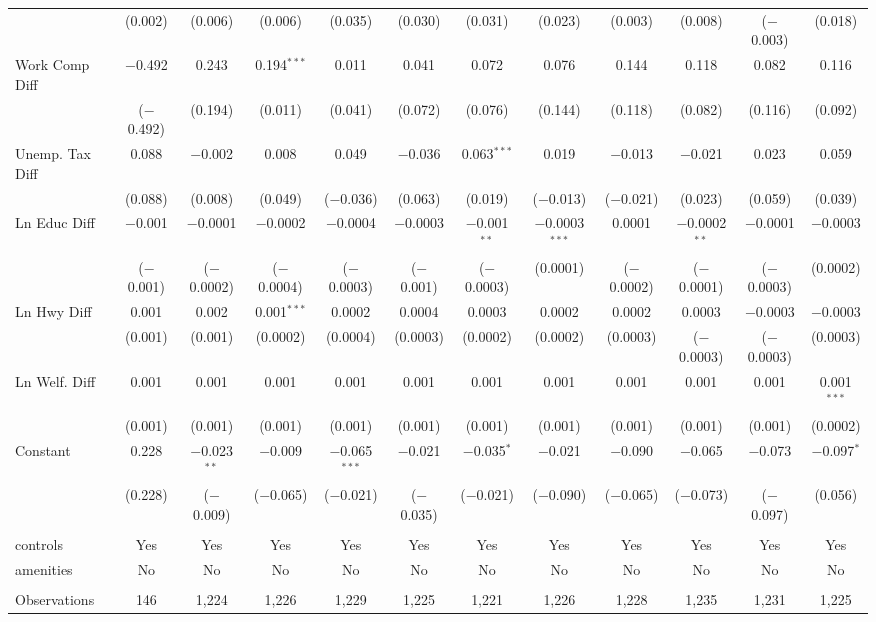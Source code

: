 \begin{table}[!htbp]
\begin{tabular}{@{\extracolsep{5pt}}lccccccccccc}
  & (0.002) & (0.006) & (0.006) & (0.035) & (0.030) & (0.031) & (0.023) & (0.003) & (0.008) & ($-$0.003) & (0.018) \\ 
  Work Comp Diff & $-$0.492 & 0.243 & 0.194$^{***}$ & 0.011 & 0.041 & 0.072 & 0.076 & 0.144 & 0.118 & 0.082 & 0.116 \\ 
  & ($-$0.492) & (0.194) & (0.011) & (0.041) & (0.072) & (0.076) & (0.144) & (0.118) & (0.082) & (0.116) & (0.092) \\ 
  Unemp. Tax Diff & 0.088 & $-$0.002 & 0.008 & 0.049 & $-$0.036 & 0.063$^{***}$ & 0.019 & $-$0.013 & $-$0.021 & 0.023 & 0.059 \\ 
  & (0.088) & (0.008) & (0.049) & ($-$0.036) & (0.063) & (0.019) & ($-$0.013) & ($-$0.021) & (0.023) & (0.059) & (0.039) \\ 
  Ln Educ Diff & $-$0.001 & $-$0.0001 & $-$0.0002 & $-$0.0004 & $-$0.0003 & $-$0.001$^{**}$ & $-$0.0003$^{***}$ & 0.0001 & $-$0.0002$^{**}$ & $-$0.0001 & $-$0.0003 \\ 
  & ($-$0.001) & ($-$0.0002) & ($-$0.0004) & ($-$0.0003) & ($-$0.001) & ($-$0.0003) & (0.0001) & ($-$0.0002) & ($-$0.0001) & ($-$0.0003) & (0.0002) \\ 
  Ln Hwy Diff & 0.001 & 0.002 & 0.001$^{***}$ & 0.0002 & 0.0004 & 0.0003 & 0.0002 & 0.0002 & 0.0003 & $-$0.0003 & $-$0.0003 \\ 
  & (0.001) & (0.001) & (0.0002) & (0.0004) & (0.0003) & (0.0002) & (0.0002) & (0.0003) & ($-$0.0003) & ($-$0.0003) & (0.0003) \\ 
  Ln Welf. Diff & 0.001 & 0.001 & 0.001 & 0.001 & 0.001 & 0.001 & 0.001 & 0.001 & 0.001 & 0.001 & 0.001$^{***}$ \\ 
  & (0.001) & (0.001) & (0.001) & (0.001) & (0.001) & (0.001) & (0.001) & (0.001) & (0.001) & (0.001) & (0.0002) \\ 
  Constant & 0.228 & $-$0.023$^{**}$ & $-$0.009 & $-$0.065$^{***}$ & $-$0.021 & $-$0.035$^{*}$ & $-$0.021 & $-$0.090 & $-$0.065 & $-$0.073 & $-$0.097$^{*}$ \\ 
  & (0.228) & ($-$0.009) & ($-$0.065) & ($-$0.021) & ($-$0.035) & ($-$0.021) & ($-$0.090) & ($-$0.065) & ($-$0.073) & ($-$0.097) & (0.056) \\ 
 \hline \\[-1.8ex] 
controls & Yes & Yes & Yes & Yes & Yes & Yes & Yes & Yes & Yes & Yes & Yes \\ 
amenities & No & No & No & No & No & No & No & No & No & No & No \\ 
\hline \\[-1.8ex] 
Observations & 146 & 1,224 & 1,226 & 1,229 & 1,225 & 1,221 & 1,226 & 1,228 & 1,235 & 1,231 & 1,225 \\ 

\end{tabular}
\end{table}
